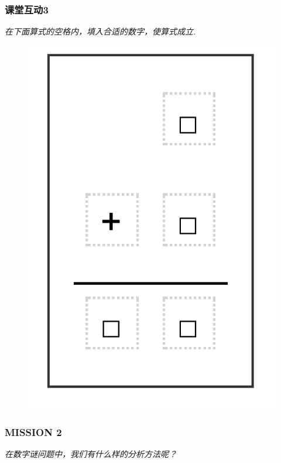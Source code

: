 \begin{frame}
    \frametitle{课堂互动3}
    \textit{在下面算式的空格内，填入合适的数字，使算式成立.}
    \begin{figure}[H] 
        \centering
        \includegraphics[width=1\textwidth]{./pics/Chapter_3/ketanghudong3.png}
    \end{figure}
\end{frame}


\begin{frame}
    \frametitle{MISSION 2}
    \textit{在数字谜问题中，我们有什么样的分析方法呢？}
\end{frame}


